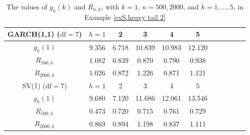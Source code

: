 \documentclass[ejsv2]{imsart}
\theoremstyle{plain}
\theoremstyle{definition}
\theoremstyle{remark}
\begin{document}
\begin{table}
\caption{The values of $g_{h}(k)$ and $R_{n,h}$, with $k=1$, $n=500, 2000$, and $h=1,\ldots, 5$, in Example \ref{exS.heavy tail 2}}
\label{tab:exS.heavy tail 2}
\centering
\begin{tabular}{ccccccccccc} \hline
    GARCH(1,1) ($\textrm{df}=7$) & $h=1$ & 2 & 3 & 4 & 5 \\ \hline
    $g_{h}(1)$ & 9.356 & 6.718 & 10.839 & 10.983 & 12.120 \\ \hline
   $R_{500,h}$ & 1.082 & 0.839 & 0.870 & 0.790 & 0.938 \\
   $R_{2000,h}$ & 1.026 & 0.872 & 1.226 & 0.871 & 1.121 \\ \hline \hline
   SV(1) ($\textrm{df}=7$) & $h=1$ & 2 & 3 & 4 & 5 \\ \hline
    $g_{h}(1)$ & 9.680 & 7.120 & 11.686 & 12.061 & 13.546 \\ \hline
   $R_{500,h}$ & 0.473 & 0.720 & 0.715 & 0.761 & 0.729 \\
   $R_{2000,h}$ & 0.869 & 0.894 & 1.198 & 0.837 & 1.111 \\ \hline
  \end{tabular}
\end{table}
\end{document}
